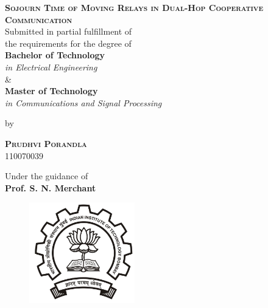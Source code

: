 \begin{titlepage}
    \begin{center}
	\textbf{%
	\vspace{0.05in}
	\Large{\textsc{Sojourn Time of Moving Relays in Dual-Hop Cooperative Communication}}\\ \vspace{0.1in}
	}
	\vspace{0.5in}
	\large Submitted in partial fulfillment of\\
	the requirements for the degree of\\
	\vspace{0.3in}
	\textbf{Bachelor of Technology} \\ \emph{in Electrical Engineering} \\ \& \\ \textbf{Master of Technology} \\ \emph{in Communications and Signal Processing}\\ \vspace{0.05in}

	\vspace{0.30in}
	\large{by}\\
	\vspace{0.30in}

	\large{\textsc{\textbf{Prudhvi Porandla}}}\\110070039

	\vspace{0.6in}
        \normalsize{Under the guidance of}\\ \vspace{0.1in}
	\textbf{\large{	Prof. S. N. Merchant
}}\\
	\vspace{0.2in}

	\begin{figure}[h]
	\begin{center}
	\includegraphics[width=1.8in]{images/logo.jpg}
	\end{center}
	\end{figure}


\end{center}
\end{titlepage}
